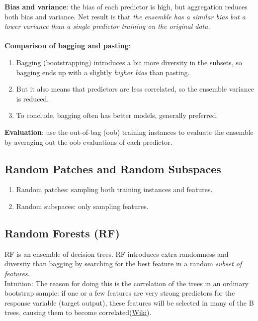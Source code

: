 \documentclass[12pt,oneside,a4paper]{article}
\numberwithin{equation}{section}
\begin{document}
\textbf{Bias and variance}: the bias of each predictor is high, but aggregation reduces both bias and variance.  Net result is that \emph{the ensemble has a similar bias but a lower variance than a single predictor training on the original data.}\\~\\

\textbf{Comparison of bagging and pasting}:
\begin{enumerate}
\item Bagging (bootstrapping) introduces a bit more diversity in the subsets, so bagging ends up with a slightly \emph{higher bias} than pasting.

\item  But it also means that predictors are less correlated, so the ensemble variance is reduced. 
\item To conclude, bagging often has better models, generally preferred. 
\end{enumerate}

\textbf{Evaluation}: use the out-of-bag (oob) training instances to evaluate the ensemble by averaging out the oob evaluations of each predictor. 


\subsection{Random Patches and Random Subspaces}

\begin{enumerate}
\item Random patches: sampling both training instances and features. 
\item Random subspaces: only sampling features.
\end{enumerate}

\subsection{Random Forests (RF)}
RF is an ensemble of decision trees. RF introduces extra randomness and diversity than bagging by searching for the best feature in a random \emph{subset of features}. \\
Intuition: The reason for doing this is the correlation of the trees in an ordinary bootstrap sample: if one or a few features are very strong predictors for the response variable (target output), these features will be selected in many of the B trees, causing them to become correlated(\href{https://en.wikipedia.org/wiki/Random_forest#From_bagging_to_random_forests}{Wiki}). 
\end{document}
